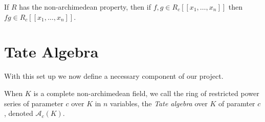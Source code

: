\begin{lemma}
  \label{mul}
  \leanok
  If $R$ has the non-archimedean property, then if $f,g \in R_c [ \! [ x_1, \dots, x_n ] \! ]$ then
  $fg \in R_c [ \! [ x_1, \dots, x_n ] \! ]$.
\end{lemma}

\section{Tate Algebra}

With this set up we now define a necessary component of our project.

\begin{definition}
  When $K$ is a complete non-archimedean field, we call the ring of restricted power series of
  parameter $c$ over $K$ in $n$ variables, the \emph{Tate algebra} over $K$ of paramter $c$, denoted
  $\mathcal{A}_c(K).$
\end{definition}
